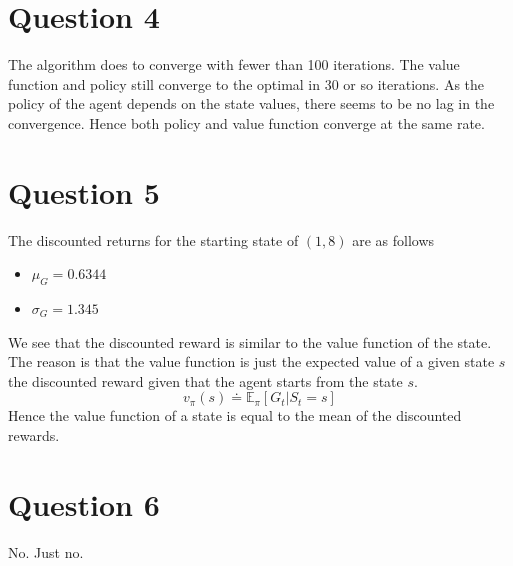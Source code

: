 \documentclass[a4paper]{article}
\begin{document}
\section{Question 4}
The algorithm does to converge with fewer than 100 iterations. The value function and policy still converge to the optimal in 30 or so iterations. As the policy of the agent depends on the state values, there seems to be no lag in the convergence. Hence both policy and value function converge at the same rate.
\section{Question 5}
The discounted returns for the starting state of $(1,8)$ are as follows 
\begin{itemize}
    \item $\mu_{G} = 0.6344$
    \item $\sigma_{G} = 1.345$
\end{itemize}
We see that the discounted reward is similar to the value function of the state. The reason is that the value function is just the expected value of a given state $s$ the discounted reward given that the agent starts from the state $s$. 
\[
v_{\pi}(s) \doteq \mathbb{E}_{\pi} \left [ G_{t} | S_{t}=s \right ]
\]
Hence the value function of a state is equal to the mean of the discounted rewards.
\section{Question 6}
No. Just no.
\end{document}
